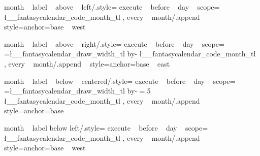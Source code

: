 \tikzset
  {
    month ~ label ~ above ~ left/.style=
      {
        execute ~ before ~ day ~ scope=
          {
              {
                {
                  \pgftransformxshift{-3.25ex}%
                  \l__fantasycalendar_code_month_tl%
                }
              } { }
          }
        ,
  every ~ month/.append ~ style={anchor=base ~ west}
}}



\tikzset
  {
    month ~ label ~ above ~ right/.style=
      {
        execute ~ before ~ day ~ scope=
          {
              {
                {
                  \pgf@xb=\l__fantasycalendar_draw_width_tl\pgf@xa%
                  \advance\pgf@xb by-\pgf@xa%
                  \pgftransformxshift{\pgf@xb}%
                  \l__fantasycalendar_code_month_tl%
                }
              } { }
          }
        ,
  every ~ month/.append ~ style={anchor=base ~ east}
}}

\tikzset
  {
    month ~ label ~ below ~ centered/.style=
      {
        execute ~ before ~ day ~ scope=
          {
              {
                {
                  \pgf@xb=\l__fantasycalendar_draw_width_tl\pgf@xa%
                  \advance\pgf@xb by-\pgf@xa%
                  \pgf@xb=.5\pgf@xb%
                  \pgftransformxshift{\pgf@xb}%
                  \pgftransformxshift{-1.5ex}%
                  \l__fantasycalendar_code_month_tl%
                }
              } { }
          }
        ,
  every ~ month/.append ~ style={anchor=base}
}}

\tikzset
  {
    month ~ label below left/.style=
      {
        execute ~ before ~ day ~ scope=
          {
              {
                {
                  \pgftransformxshift{-3.25ex}%
                  \l__fantasycalendar_code_month_tl%
                }
              } { }
          }
        ,
  every ~ month/.append ~ style={anchor=base ~ west}
}}









